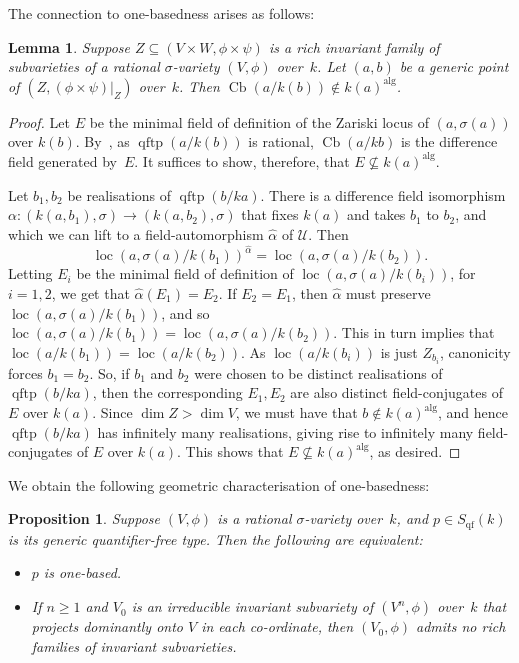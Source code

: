 \documentclass[\DocOpts]{amsart}
\newtheorem{lemma}[theorem]{Lemma}
\newtheorem{proposition}[theorem]{Proposition}
\theoremstyle{definition}
\def\cb{\operatorname{Cb}}
\def\qftp{\operatorname{qftp}}
\def\qf{\operatorname{qf}}
\def\alg{{\operatorname{alg}}}
\def\loc{\operatorname{loc}}
\def\U{\mathcal{U}}
\newcommand{\<}{\langle}
\renewcommand{\>}{\rangle}
\begin{document}
The connection to one-basedness arises as follows:

\begin{lemma}\label{lem:richcb}
Suppose $Z\subseteq(V\times W,\phi\times\psi)$ is a rich invariant family of subvarieties of a rational $\sigma$-variety $(V,\phi)$ over~$k$.
Let $(a,b)$ be a generic point of $(Z,(\phi\times\psi)|_Z)$ over~$k$.
Then $\cb(a/k(b))\notin {k(a)}^{\alg}$.
\end{lemma}

\begin{proof}
Let $E$ be the minimal field of definition of the Zariski locus of $(a,\sigma(a))$ over $k(b)$.
By~\cite[Lemma~2.5]{qfint}, as $\qftp(a/k(b))$ is rational, $\cb(a/kb)$ is the difference field generated by~$E$.
It suffices to show, therefore, that $E\not\subseteq k(a)^{\alg}$.

Let $b_1,b_2$ be realisations of $\qftp(b/ka)$.
There is a difference field isomorphism $\alpha:(k(a,b_1),\sigma)\to(k(a,b_2),\sigma)$ that fixes $k(a)$ and takes $b_1$ to $b_2$, and which we can lift to a field-automorphism $\widehat\alpha$ of $\U$.
Then
$$\loc(a,\sigma(a)/k(b_1))^{\widehat\alpha}=\loc(a,\sigma(a)/k(b_2)).$$
Letting $E_i$ be the minimal field of definition of $\loc(a,\sigma(a)/k(b_i))$, for $i=1,2$, we get that $\widehat\alpha(E_1)=E_2$.
If $E_2=E_1$, then $\widehat\alpha$ must preserve $\loc(a,\sigma(a)/k(b_1))$, and so
$\loc(a,\sigma(a)/k(b_1))=\loc(a,\sigma(a)/k(b_2))$.
This in turn implies that
$\loc(a/k(b_1))=\loc(a/k(b_2))$.
As $\loc(a/k(b_i))$ is just $Z_{b_i}$, canonicity forces $b_1=b_2$.
So, if $b_1$ and $b_2$ were chosen to be distinct realisations of $\qftp(b/ka)$, then the corresponding $E_1,E_2$ are also distinct field-conjugates of $E$ over $k(a)$.
Since $\dim Z>\dim V$, we must have that $b\notin k(a)^{\alg}$, and hence $\qftp(b/ka)$ has infinitely many realisations, giving rise to infinitely many field-conjugates of $E$ over $k(a)$.
This shows that $E\not\subseteq k(a)^{\alg}$, as desired.
\end{proof}

We obtain the following geometric characterisation of one-basedness:

\begin{proposition}
\label{prop:1b-geo}
Suppose $(V,\phi)$ is a rational $\sigma$-variety over~$k$, and $p\in S_{\qf}(k)$ is its generic quantifier-free type.
    Then the following are equivalent:
    \begin{itemize}
        \item[(i)]
        $p$ is one-based.
        \item[(ii)]
        If $n\geq 1$ and $V_0$ is an irreducible invariant subvariety of $(V^n,\phi)$ over~$k$ that projects dominantly onto $V$ in each co-ordinate, then $(V_0,\phi)$ admits no rich families of invariant subvarieties.
        \end{itemize}
\end{proposition}
\end{document}
